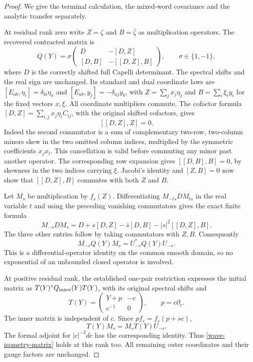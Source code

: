 \begin{proof}
We give the terminal calculation, the mixed-word covariance and
the analytic transfer separately.

At residual rank zero write $Z=\zeta$ and $B=\bar\zeta$ as
multiplication operators.  The recovered contracted matrix is
\begin{equation}\label{wave-isometry-contracted}
 Q(Y)=\sigma\begin{pmatrix}
 D&-[D,Z]\\ [D,B]&-[[D,Z],B]
 \end{pmatrix},\qquad \sigma\in\{1,-1\},
\end{equation}
where $D$ is the correctly shifted full Capelli determinant.
The spectral shifts and the real sign are unchanged.  Its standard
and dual coordinate laws are
$[E_{ab},\eta_i]=\delta_{bi}\eta_a$ and
$[E_{ab},y_j]=-\delta_{aj}y_b$, with
$Z=\sum_jx_j\eta_j$ and $B=\sum_i\xi_i y_i$ for the fixed
vectors $x,\xi$.  All coordinate multipliers commute.
The cofactor formula
$[D,Z]=\sum_{i,j}x_j\eta_i C_{ij}$, with the original shifted
cofactors, gives
\[
                         [[D,Z],Z]=0.
\]
Indeed the second commutator is a sum of complementary two-row,
two-column minors skew in the two omitted column indices, multiplied
by the symmetric coefficients $x_jx_l$.  This cancellation is valid
before commuting any minor past another operator.  The corresponding
row expansion gives $[[D,B],B]=0$, by skewness in the two indices
carrying $\xi$.  Jacobi's identity and $[Z,B]=0$ now show that
$[[D,Z],B]$ commutes with both $Z$ and $B$.

Let $M_s$ be multiplication by $f_s(Z)$.  Differentiating
$M_{-ts}DM_{ts}$ in the real variable $t$ and using the preceding
vanishing commutators gives the exact finite formula
\[
 M_{-s}DM_s=D+s[D,Z]-\bar s[D,B]
                              -|s|^2[[D,Z],B].
\]
The three other entries follow by taking commutators with $Z,B$.
Consequently
\begin{equation}\label{wave-isometry-matrix}
                 M_{-s}Q(Y)M_s=U_{-s}^*Q(Y)U_{-s}.
\end{equation}
This is a differential-operator identity on the common smooth
domain, so no exponential of an unbounded closed operator is involved.

At positive residual rank, the established one-pair restriction
expresses the initial matrix as $T(Y)^*Q_{\rm inner}(Y)T(Y)$,
with its original spectral shifts and
\[
 T(Y)=\begin{pmatrix}Y+p&-c\\c^{-1}&0\end{pmatrix},
 \qquad p=c\partial_c.
\]
The inner matrix is independent of $c$.  Since
$p f_s=f_s(p+sc)$,
\[
                  T(Y)M_s=M_sT(Y)U_{-s}.
\]
The formal adjoint for $|c|^{-2}dc$ has the corresponding identity.
Thus \eqref{wave-isometry-matrix} holds at this rank too.  All
remaining outer coordinates and their gauge factors are unchanged.


\end{proof}
